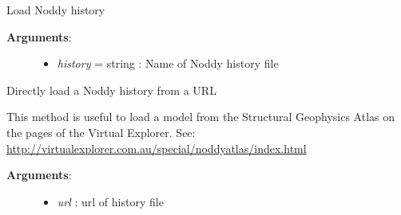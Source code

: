 \documentclass[a4paper,10pt,english]{sphinxmanual}
\begin{document}
\begin{fulllineitems}
\begin{fulllineitems}
\begin{description}
\begin{itemize}
\end{itemize}

\end{description}

\end{fulllineitems}


\begin{fulllineitems}
\label{pynoddy:pynoddy.history.NoddyHistory.load_history}
Load Noddy history
\begin{description}
\item[{\textbf{Arguments}:}] \leavevmode\begin{itemize}
\item {} 
\emph{history} = string : Name of Noddy history file

\end{itemize}

\end{description}

\end{fulllineitems}


\begin{fulllineitems}
\label{pynoddy:pynoddy.history.NoddyHistory.load_history_from_url}
Directly load a Noddy history from a URL

This method is useful to load a model from the Structural Geophysics
Atlas on the pages of the Virtual Explorer.
See: \href{http://virtualexplorer.com.au/special/noddyatlas/index.html}{http://virtualexplorer.com.au/special/noddyatlas/index.html}
\begin{description}
\item[{\textbf{Arguments}:}] \leavevmode\begin{itemize}
\item {} 
\emph{url} : url of history file

\end{itemize}

\end{description}

\end{fulllineitems}



\end{fulllineitems}
\end{document}
